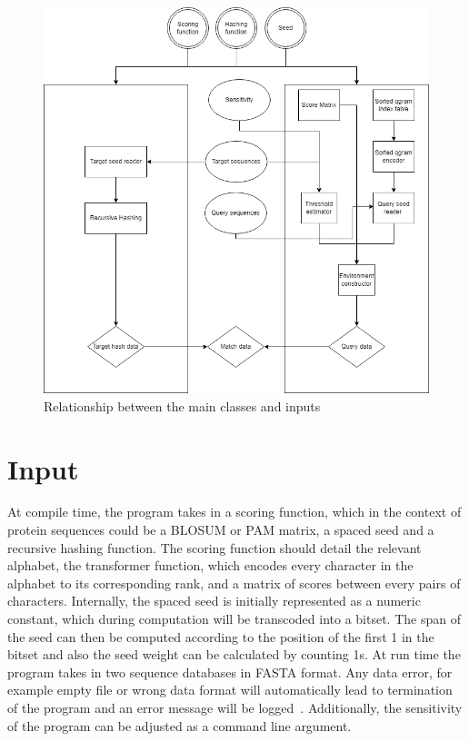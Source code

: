 \documentclass[twoside,a4paper,bsc]{master}
\begin{document}
\begin{figure}[t]
\begin{center}
\includegraphics[scale=0.5]{graphics/Class_Diagram.png}
\end{center}
\caption{Relationship between the main classes and inputs}
\label{fig:classes}
\end{figure}
\section{Input}
At compile time, the program takes in a scoring function, which in the
context of protein sequences could be a BLOSUM or PAM matrix, a spaced seed
and a recursive hashing function. The scoring function should detail the
relevant alphabet, the transformer function, which encodes every character
in the alphabet to its corresponding rank, and a matrix of scores between
every pairs of characters. Internally, the spaced seed is initially
represented as a numeric constant, which during computation will be
transcoded into a bitset. The span of the seed can then be computed
according to the position of the first 1 in the bitset and also the seed
weight can be calculated by counting 1s.
At run time the program takes in two sequence databases in FASTA format.
Any data error, for example empty file or wrong data format will
automatically lead to termination of the program and an error message will
be logged~\cite{gttl}. Additionally, the sensitivity of the program can be
adjusted as a command line argument.
\end{document}
